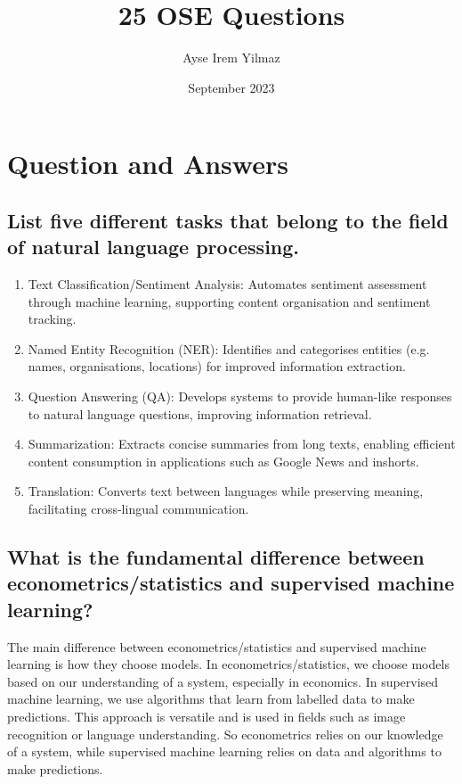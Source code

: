 \documentclass{article}
\title{25 OSE Questions}
\author{Ayse Irem Yilmaz}
\date{September 2023}
\begin{document}
\maketitle

\tableofcontents

\newpage

\section{Question and Answers}

\subsection{List five different tasks that belong to the field of natural language processing.}

\begin{enumerate}
    \item Text Classification/Sentiment Analysis: Automates sentiment assessment through machine learning, supporting content organisation and sentiment tracking.
    \item Named Entity Recognition (NER): Identifies and categorises entities (e.g. names, organisations, locations) for improved information extraction.
    \item Question Answering (QA): Develops systems to provide human-like responses to natural language questions, improving information retrieval.
    \item Summarization: Extracts concise summaries from long texts, enabling efficient content consumption in applications such as Google News and inshorts.
    \item Translation: Converts text between languages while preserving meaning, facilitating cross-lingual communication.
\end{enumerate}


\subsection{What is the fundamental difference between econometrics/statistics and supervised machine learning?}

The main difference between econometrics/statistics and supervised machine learning is how they choose models. 
In econometrics/statistics, we choose models based on our understanding of a system, especially in economics.
In supervised machine learning, we use algorithms that learn from labelled data to make predictions.
This approach is versatile and is used in fields such as image recognition or language understanding.
So econometrics relies on our knowledge of a system, while supervised machine learning relies on data and algorithms to make predictions.
\end{document}
